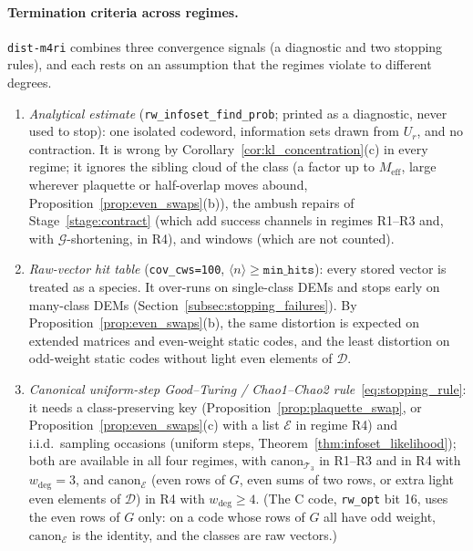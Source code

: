 \documentclass[12pt]{article}
\theoremstyle{definition}
\newcommand{\Dc}{\mathcal{D}}
\newcommand{\Tc}{\mathcal{T}_3}
\newcommand{\Gc}{\mathcal{G}}
\newcommand{\ttt}[1]{\texttt{#1}}
\begin{document}
\paragraph{Termination criteria across regimes.}
\ttt{dist-m4ri} combines three convergence signals (a diagnostic and two stopping rules), and each rests on an
assumption that the regimes violate to different degrees.
\begin{enumerate}[label=(\roman*)]
  \item \emph{Analytical estimate} (\ttt{rw\_infoset\_find\_prob}; printed as a diagnostic, never used to stop): one
    isolated codeword, information sets drawn from
    $U_r$, and no contraction. It is wrong by Corollary~\ref{cor:kl_concentration}(c) in every regime; it ignores the
    sibling cloud of the class (a factor up to $M_{\mathrm{eff}}$, large wherever plaquette or half-overlap moves
    abound, Proposition~\ref{prop:even_swaps}(b)), the ambush repairs of Stage~\ref{stage:contract} (which add success
    channels in regimes R1--R3 and, with $\Gc$-shortening, in R4), and windows (which are not counted).
  \item \emph{Raw-vector hit table} (\ttt{cov\_cws=100}, $\langle n \rangle \ge \ttt{min\_hits}$): every stored
    vector is treated as a species. It over-runs on single-class DEMs and stops early on many-class DEMs
    (Section~\ref{subsec:stopping_failures}). By Proposition~\ref{prop:even_swaps}(b), the same distortion is expected
    on extended matrices and even-weight static codes, and the least distortion on odd-weight static codes without
    light even elements of $\Dc$.
  \item \emph{Canonical uniform-step Good--Turing / Chao1--Chao2 rule}~\eqref{eq:stopping_rule}: it needs a
    class-preserving key (Proposition~\ref{prop:plaquette_swap}, or Proposition~\ref{prop:even_swaps}(c) with a list
    $\mathcal{E}$ in regime R4) and i.i.d.\ sampling occasions (uniform steps, Theorem~\ref{thm:infoset_likelihood});
    both are available in all four regimes, with $\mathrm{canon}_{\Tc}$ in R1--R3 and in R4 with $w_{\deg} = 3$, and
    $\mathrm{canon}_{\mathcal{E}}$ (even rows of $G$, even sums of two rows, or extra light even elements of $\Dc$) in
    R4 with $w_{\deg} \ge 4$. (The C code, \ttt{rw\_opt} bit 16, uses the even rows of $G$ only: on a code whose rows
    of $G$ all have odd weight, $\mathrm{canon}_{\mathcal{E}}$ is the identity, and the classes are raw vectors.)
\end{enumerate}
\end{document}

